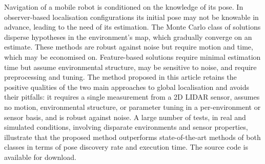 Navigation of a mobile robot is conditioned on the knowledge of its pose. In
observer-based localisation configurations its initial pose may not be knowable
in advance, leading to the need of its estimation. The Monte Carlo class of
solutions disperse hypotheses in the environment's map, which gradually
converge on an estimate. These methods are robust against noise but require
motion and time, which may be economised on. Feature-based solutions require
minimal estimation time but assume environmental structure, may be sensitive to
noise, and require preprocessing and tuning. The method proposed in this
article retains the positive qualities of the two main approaches to global
localisation and avoids their pitfalls: it requires a single measurement from a
2D LIDAR sensor, assumes no motion, environmental structure, or parameter
tuning in a per-environment or sensor basis, and is robust against noise.  A
large number of tests, in real and simulated conditions, involving disparate
environments and sensor properties, illustrate that the proposed method
outperforms state-of-the-art methods of both classes in terms of pose discovery
rate and execution time. The source code is available for download.
